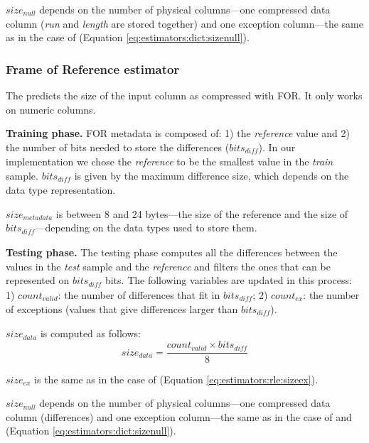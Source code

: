 \(size_{null}\) depends on the number of physical columns---one compressed data column (\textit{run} and \textit{length} are stored together) and one exception column---the same as in the case of  (Equation \ref{eq:estimators:dict:sizenull}).



\subsubsection{Frame of Reference estimator}
\label{subsub:estimator:for}

The  predicts the size of the input column as compressed with FOR. It only works on numeric columns.

\textbf{Training phase.} FOR metadata is composed of: 1) the \textit{reference} value and 2) the number of bits needed to store the differences (\(bits_{\mathit{diff}}\)). In our implementation we chose the \textit{reference} to be the smallest value in the \textit{train} sample. \(bits_{\mathit{diff}}\) is given by the maximum difference size, which depends on the data type representation.

\(size_{metadata}\) is between 8 and 24 bytes---the size of the reference and the size of \(bits_{\mathit{diff}}\)---depending on the data types used to store them.

\textbf{Testing phase.} The testing phase computes all the differences between the values in the \textit{test} sample and the \textit{reference} and filters the ones that can be represented on \(bits_{\mathit{diff}}\) bits. The following variables are updated in this process: 1) \(count_{valid}\): the number of differences that fit in \(bits_{\mathit{diff}}\); 2) \(count_{ex}\): the number of exceptions (values that give differences larger than \(bits_{\mathit{diff}}\)).

\(size_{data}\) is computed as follows:
\begin{equation}
\label{eq:estimators:for:sizedata}
size_{data} = \frac{count_{valid} \times bits_{\mathit{diff}}}{8}
\end{equation}

\(size_{ex}\) is the same as in the case of  (Equation \ref{eq:estimators:rle:sizeex}).

\(size_{null}\) depends on the number of physical columns---one compressed data column (differences) and one exception column---the same as in the case of  and  (Equation \ref{eq:estimators:dict:sizenull}).

